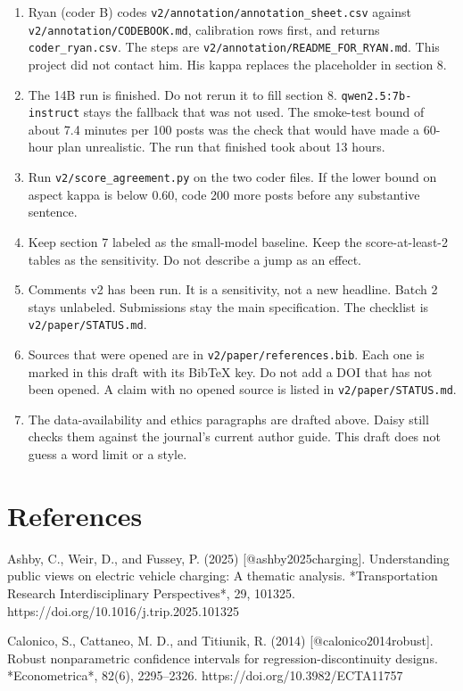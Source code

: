 \documentclass[11pt]{article}
\begin{document}
\begin{enumerate}
\item Ryan (coder B) codes \texttt{v2/annotation/annotation\_sheet.csv} against \texttt{v2/annotation/CODEBOOK.md}, calibration rows first, and returns \texttt{coder\_ryan.csv}. The steps are \texttt{v2/annotation/README\_FOR\_RYAN.md}. This project did not contact him. His kappa replaces the placeholder in section 8.
\item The 14B run is finished. Do not rerun it to fill section 8. \texttt{qwen2.5:7b-instruct} stays the fallback that was not used. The smoke-test bound of about 7.4 minutes per 100 posts was the check that would have made a 60-hour plan unrealistic. The run that finished took about 13 hours.
\item Run \texttt{v2/score\_agreement.py} on the two coder files. If the lower bound on aspect kappa is below 0.60, code 200 more posts before any substantive sentence.
\item Keep section 7 labeled as the small-model baseline. Keep the score-at-least-2 tables as the sensitivity. Do not describe a jump as an effect.
\item Comments v2 has been run. It is a sensitivity, not a new headline. Batch 2 stays unlabeled. Submissions stay the main specification. The checklist is \texttt{v2/paper/STATUS.md}.
\item Sources that were opened are in \texttt{v2/paper/references.bib}. Each one is marked in this draft with its BibTeX key. Do not add a DOI that has not been opened. A claim with no opened source is listed in \texttt{v2/paper/STATUS.md}.
\item The data-availability and ethics paragraphs are drafted above. Daisy still checks them against the journal's current author guide. This draft does not guess a word limit or a style.
\end{enumerate}


\section{References}

Ashby, C., Weir, D., and Fussey, P. (2025) [@ashby2025charging]. Understanding public views on electric vehicle charging: A thematic analysis. *Transportation Research Interdisciplinary Perspectives*, 29, 101325. https://doi.org/10.1016/j.trip.2025.101325


Calonico, S., Cattaneo, M. D., and Titiunik, R. (2014) [@calonico2014robust]. Robust nonparametric confidence intervals for regression-discontinuity designs. *Econometrica*, 82(6), 2295–2326. https://doi.org/10.3982/ECTA11757
\end{document}
